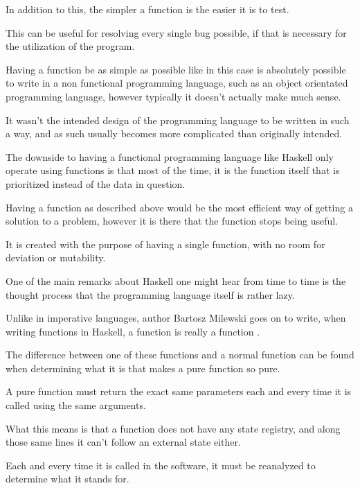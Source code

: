 \documentclass{article}
\begin{document}
\medskip\noindent
In addition to this, the simpler a function is the easier it is to test. 

\medskip\noindent
This can be useful for resolving every single bug possible, if that is necessary for the utilization of the program.

\medskip\noindent
Having a function be as simple as possible like in this case is absolutely possible to write in a non functional programming language, such as an object orientated programming language, however typically it doesn't actually make much sense. 

\medskip\noindent
It wasn't the intended design of the programming language to be written in such a way, and as such usually becomes more complicated than originally intended.

\medskip\noindent
The downside to having a functional programming language like Haskell only operate using functions is that most of the time, it is the function itself that is prioritized instead of the data in question. 

\medskip\noindent
Having a function as described above would be the most efficient way of getting a solution to a problem, however it is there that the function stops being useful.  

\medskip\noindent
It is created with the purpose of having a single function, with no room for deviation or mutability. 

\medskip\noindent
One of the main remarks about Haskell one might hear from time to time is the thought process that the programming language itself is rather lazy.

\medskip\noindent
Unlike in imperative languages, author Bartosz Milewski goes on to write, when writing functions in Haskell, a function is really a function \cite{LZ}.

\medskip\noindent
The difference between one of these functions and a normal function can be found when determining what it is that makes a pure function so pure.

\medskip\noindent
A pure function must return the exact same parameters each and every time it is called using the same arguments.

\medskip\noindent
What this means is that a function does not have any state registry, and along those same lines it can't follow an external state either. 

\medskip\noindent
Each and every time it is called in the software, it must be reanalyzed to determine what it stands for. 
\end{document}
